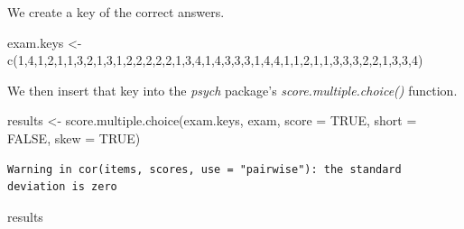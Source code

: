 \documentclass[
  english,
]{book}
\newenvironment{Shaded}{\begin{snugshade}}{\end{snugshade}}
\newcommand{\AttributeTok}[1]{\textcolor[rgb]{0.77,0.63,0.00}{#1}}
\newcommand{\ConstantTok}[1]{\textcolor[rgb]{0.00,0.00,0.00}{#1}}
\newcommand{\DecValTok}[1]{\textcolor[rgb]{0.00,0.00,0.81}{#1}}
\newcommand{\FunctionTok}[1]{\textcolor[rgb]{0.00,0.00,0.00}{#1}}
\newcommand{\NormalTok}[1]{#1}
\newcommand{\OtherTok}[1]{\textcolor[rgb]{0.56,0.35,0.01}{#1}}
\begin{document}
We create a key of the correct answers.

\begin{Shaded}
\begin{Highlighting}[]
\NormalTok{exam.keys }\OtherTok{\textless{}{-}} \FunctionTok{c}\NormalTok{(}\DecValTok{1}\NormalTok{,}\DecValTok{4}\NormalTok{,}\DecValTok{1}\NormalTok{,}\DecValTok{2}\NormalTok{,}\DecValTok{1}\NormalTok{,}\DecValTok{1}\NormalTok{,}\DecValTok{3}\NormalTok{,}\DecValTok{2}\NormalTok{,}\DecValTok{1}\NormalTok{,}\DecValTok{3}\NormalTok{,}\DecValTok{1}\NormalTok{,}\DecValTok{2}\NormalTok{,}\DecValTok{2}\NormalTok{,}\DecValTok{2}\NormalTok{,}\DecValTok{2}\NormalTok{,}\DecValTok{2}\NormalTok{,}\DecValTok{1}\NormalTok{,}\DecValTok{3}\NormalTok{,}\DecValTok{4}\NormalTok{,}\DecValTok{1}\NormalTok{,}\DecValTok{4}\NormalTok{,}\DecValTok{3}\NormalTok{,}\DecValTok{3}\NormalTok{,}\DecValTok{3}\NormalTok{,}\DecValTok{1}\NormalTok{,}\DecValTok{4}\NormalTok{,}\DecValTok{4}\NormalTok{,}\DecValTok{1}\NormalTok{,}\DecValTok{1}\NormalTok{,}\DecValTok{2}\NormalTok{,}\DecValTok{1}\NormalTok{,}\DecValTok{1}\NormalTok{,}\DecValTok{3}\NormalTok{,}\DecValTok{3}\NormalTok{,}\DecValTok{3}\NormalTok{,}\DecValTok{2}\NormalTok{,}\DecValTok{2}\NormalTok{,}\DecValTok{1}\NormalTok{,}\DecValTok{3}\NormalTok{,}\DecValTok{3}\NormalTok{,}\DecValTok{4}\NormalTok{)  }
\end{Highlighting}
\end{Shaded}

We then insert that key into the \emph{psych} package's \emph{score.multiple.choice()} function.

\begin{Shaded}
\begin{Highlighting}[]
\NormalTok{results }\OtherTok{\textless{}{-}} \FunctionTok{score.multiple.choice}\NormalTok{(exam.keys, exam, }\AttributeTok{score =} \ConstantTok{TRUE}\NormalTok{, }\AttributeTok{short =} \ConstantTok{FALSE}\NormalTok{, }\AttributeTok{skew =} \ConstantTok{TRUE}\NormalTok{)}
\end{Highlighting}
\end{Shaded}

\begin{verbatim}
Warning in cor(items, scores, use = "pairwise"): the standard deviation is zero
\end{verbatim}

\begin{Shaded}
\begin{Highlighting}[]
\NormalTok{results}
\end{Highlighting}
\end{Shaded}
\end{document}
